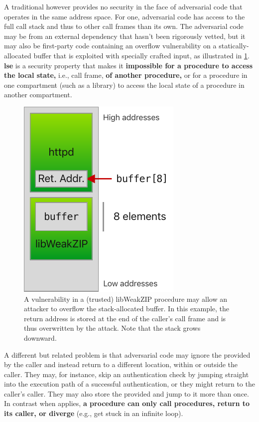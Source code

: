 \documentclass[main.tex]{subfiles}
\begin{document}
A traditional  however provides no security in the face of adversarial code that operates in the same address space. For one, adversarial code has access to the full call stack and thus to other call frames than its own. The adversarial code may be from an external dependency that hasn't been rigorously vetted, but it may also be first-party code containing an overflow vulnerability on a statically-allocated buffer that is exploited with specially crafted input, as illustrated in \cref{fig:buffoverflow}. \textbf{\Gls{lse}} is a security property that makes it \textbf{impossible for a procedure to access the local state,} i.e., call frame, \textbf{of another procedure,} or for a procedure in one compartment (such as a library) to access the local state of a procedure in another compartment.

\begin{figure}
	\begin{center}
		\includegraphics{Images/Buffer Overflow.pdf}
	\end{center}
	\caption{A vulnerability in a (trusted) libWeakZIP procedure may allow an attacker to overflow the stack-allocated buffer. In this example, the return address is stored at the end of the caller's call frame and is thus overwritten by the attack. Note that the stack grows downward.}
	\label{fig:buffoverflow}
\end{figure}

A different but related problem is that adversarial code may ignore the  provided by the caller and instead return to a different location, within or outside the caller. They may, for instance, skip an authentication check by jumping straight into the execution path of a successful authentication, or they might return to the caller's caller. They may also store the provided  and jump to it more than once. In contrast when \textbf{} applies, \textbf{a procedure can only call procedures, return to its caller, or diverge} (e.g., get stuck in an infinite loop).
\end{document}
